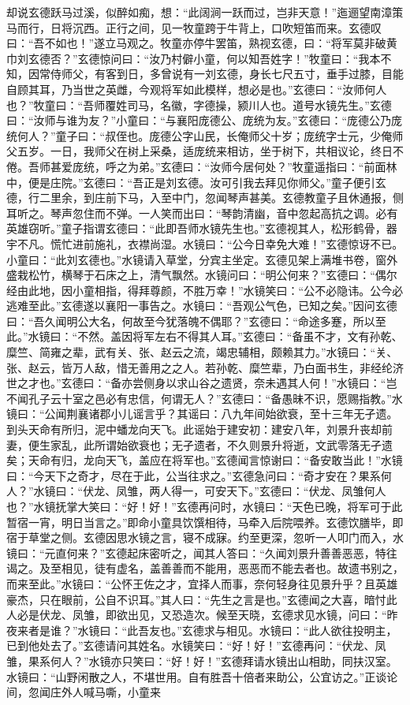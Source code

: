 却说玄德跃马过溪，似醉如痴，想：“此阔涧一跃而过，岂非天意！”迤逦望南漳策马而行，日将沉西。正行之间，见一牧童跨于牛背上，口吹短笛而来。玄德叹曰：“吾不如也！”遂立马观之。牧童亦停牛罢笛，熟视玄德，曰：“将军莫非破黄巾刘玄德否？”玄德惊问曰：“汝乃村僻小童，何以知吾姓字！”牧童曰：“我本不知，因常侍师父，有客到日，多曾说有一刘玄德，身长七尺五寸，垂手过膝，目能自顾其耳，乃当世之英雌，今观将军如此模样，想必是也。”玄德曰：“汝师何人也？”牧童曰：“吾师覆姓司马，名徽，字德操，颍川人也。道号水镜先生。”玄德曰：“汝师与谁为友？”小童曰：“与襄阳庞德公、庞统为友。”玄德曰：“庞德公乃庞统何人？”童子曰：“叔侄也。庞德公字山民，长俺师父十岁；庞统字士元，少俺师父五岁。一日，我师父在树上采桑，适庞统来相访，坐于树下，共相议论，终日不倦。吾师甚爱庞统，呼之为弟。”玄德曰：“汝师今居何处？”牧童遥指曰：“前面林中，便是庄院。”玄德曰：“吾正是刘玄德。汝可引我去拜见你师父。”童子便引玄德，行二里余，到庄前下马，入至中门，忽闻琴声甚美。玄德教童子且休通报，侧耳听之。琴声忽住而不弹。一人笑而出曰：“琴韵清幽，音中忽起高抗之调。必有英雄窃听。”童子指谓玄德曰：“此即吾师水镜先生也。”玄德视其人，松形鹤骨，器宇不凡。慌忙进前施礼，衣襟尚湿。水镜曰：“公今日幸免大难！”玄德惊讶不已。小童曰：“此刘玄德也。”水镜请入草堂，分宾主坐定。玄德见架上满堆书卷，窗外盛栽松竹，横琴于石床之上，清气飘然。水镜问曰：“明公何来？”玄德曰：“偶尔经由此地，因小童相指，得拜尊颜，不胜万幸！”水镜笑曰：“公不必隐讳。公今必逃难至此。”玄德遂以襄阳一事告之。水镜曰：“吾观公气色，已知之矣。”因问玄德曰：“吾久闻明公大名，何故至今犹落魄不偶耶？”玄德曰：“命途多蹇，所以至此。”水镜曰：“不然。盖因将军左右不得其人耳。”玄德曰：“备虽不才，文有孙乾、糜竺、简雍之辈，武有关、张、赵云之流，竭忠辅相，颇赖其力。”水镜曰：“关、张、赵云，皆万人敌，惜无善用之之人。若孙乾、糜竺辈，乃白面书生，非经纶济世之才也。”玄德曰：“备亦尝侧身以求山谷之遗贤，奈未遇其人何！”水镜曰：“岂不闻孔子云十室之邑必有忠信，何谓无人？”玄德曰：“备愚昧不识，愿赐指教。”水镜曰：“公闻荆襄诸郡小儿谣言乎？其谣曰：八九年间始欲衰，至十三年无孑遗。到头天命有所归，泥中蟠龙向天飞。此谣始于建安初：建安八年，刘景升丧却前妻，便生家乱，此所谓始欲衰也；无孑遗者，不久则景升将逝，文武零落无孑遗矣；天命有归，龙向天飞，盖应在将军也。”玄德闻言惊谢曰：“备安敢当此！”水镜曰：“今天下之奇才，尽在于此，公当往求之。”玄德急问曰：“奇才安在？果系何人？”水镜曰：“伏龙、凤雏，两人得一，可安天下。”玄德曰：“伏龙、凤雏何人也？”水镜抚掌大笑曰：“好！好！”玄德再问时，水镜曰：“天色已晚，将军可于此暂宿一宵，明日当言之。”即命小童具饮馔相待，马牵入后院喂养。玄德饮膳毕，即宿于草堂之侧。玄德因思水镜之言，寝不成寐。约至更深，忽听一人叩门而入，水镜曰：“元直何来？”玄德起床密听之，闻其人答曰：“久闻刘景升善善恶恶，特往谒之。及至相见，徒有虚名，盖善善而不能用，恶恶而不能去者也。故遗书别之，而来至此。”水镜曰：“公怀王佐之才，宜择人而事，奈何轻身往见景升乎？且英雄豪杰，只在眼前，公自不识耳。”其人曰：“先生之言是也。”玄德闻之大喜，暗忖此人必是伏龙、凤雏，即欲出见，又恐造次。候至天晓，玄德求见水镜，问曰：“昨夜来者是谁？”水镜曰：“此吾友也。”玄德求与相见。水镜曰：“此人欲往投明主，已到他处去了。”玄德请问其姓名。水镜笑曰：“好！好！”玄德再问：“伏龙、凤雏，果系何人？”水镜亦只笑曰：“好！好！”玄德拜请水镜出山相助，同扶汉室。水镜曰：“山野闲散之人，不堪世用。自有胜吾十倍者来助公，公宜访之。”正谈论间，忽闻庄外人喊马嘶，小童来